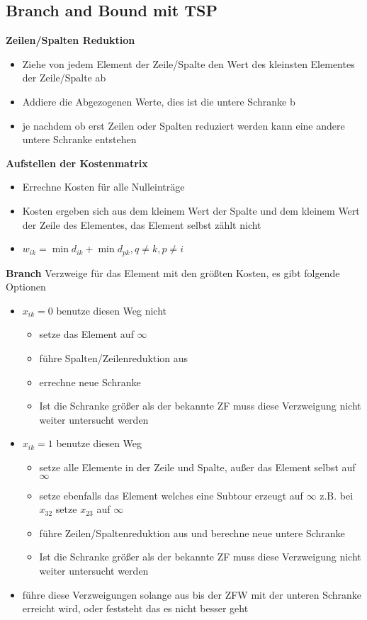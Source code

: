 \documentclass[12pt,a4paper, hyperref]{article}
\begin{document}
\subsection{Branch and Bound mit TSP}
\textbf{Zeilen/Spalten Reduktion}
\begin{itemize}
\item Ziehe von jedem Element der Zeile/Spalte den Wert des kleinsten Elementes der Zeile/Spalte ab
\item Addiere die Abgezogenen Werte, dies ist die untere Schranke b
\item je nachdem ob erst Zeilen oder Spalten reduziert werden kann eine andere untere Schranke entstehen
\end{itemize}
\textbf{Aufstellen der Kostenmatrix}
\begin{itemize}
\item Errechne Kosten für alle Nulleinträge
\item Kosten ergeben sich aus dem kleinem Wert der Spalte und dem kleinem Wert der Zeile des Elementes, das Element selbst zählt nicht
\item $w_{ik} = \min d_{ik} + \min d_{pk}, q \neq k, p \neq i$
\end{itemize}
\textbf{Branch}
Verzweige für das Element mit den größten Kosten, es gibt folgende Optionen
\begin{itemize}
\item $x_{ik} = 0$ benutze diesen Weg nicht
\begin{itemize}
\item setze das Element auf $\infty$
\item führe Spalten/Zeilenreduktion aus
\item errechne neue Schranke
\item Ist die Schranke größer als der bekannte ZF muss diese Verzweigung nicht weiter untersucht werden
\end{itemize}
\item $x_{ik} = 1$ benutze diesen Weg
\begin{itemize}
\item setze alle Elemente in der Zeile und Spalte, außer das Element selbst auf $\infty$
\item setze ebenfalls das Element welches eine Subtour erzeugt auf $\infty$ z.B. bei $x_{32}$ setze $x_{23}$ auf $\infty$
\item führe Zeilen/Spaltenreduktion aus und berechne neue untere Schranke
\item Ist die Schranke größer als der bekannte ZF muss diese Verzweigung nicht weiter untersucht werden
\end{itemize}
\item führe diese Verzweigungen solange aus bis der ZFW mit der unteren Schranke erreicht wird, oder feststeht das es nicht besser geht
\end{itemize}
\end{document}
